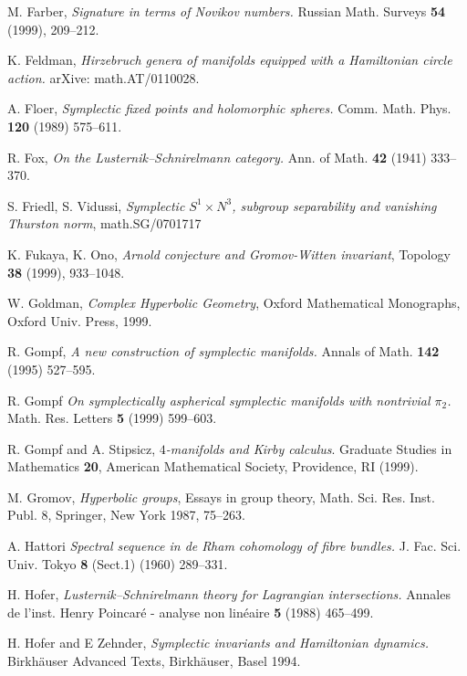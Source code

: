 \documentclass[12pt]{amsart}
\numberwithin{equation}{section}
\theoremstyle{definition}
\theoremstyle{remark}
\numberwithin{figure}{section}
\numberwithin{table}{section}
\begin{document}
\begin{thebibliography}{ABCDE}
 
 M. Farber, {\em Signature in terms of Novikov numbers.}  
Russian Math. Surveys  
{\bf 54} (1999), 209--212. 
 
 K. Feldman, {\em Hirzebruch genera of manifolds equipped with  
a Hamiltonian  
circle action.} arXive: math.AT/0110028. 
 
A. Floer, {\em Symplectic fixed points and holomorphic spheres.} 
Comm. Math. Phys. {\bf  120} (1989) 575--611. 
 
 
R. Fox, {\em On the Lusternik--Schnirelmann category.} 
Ann. of Math. \textbf{42} (1941) 333--370. 
  
 S. Friedl, S. Vidussi, {\em Symplectic $S^1\times N^3$, 
subgroup separability and vanishing Thurston norm}, math.SG/0701717  
 
 K. Fukaya, K. Ono, 
{\em Arnold conjecture and Gromov-Witten invariant},
Topology {\bf 38} (1999),  933--1048.

W. Goldman, {\it Complex Hyperbolic Geometry},  
Oxford Mathematical Monographs, Oxford Univ. Press, 1999. 
 
R. Gompf, {\em A new construction of symplectic manifolds.} 
Annals of Math. 
{\bf  142} (1995) 527--595. 
 
R. Gompf {\em On symplectically aspherical symplectic manifolds with nontrivial 
$\pi_2$.} Math. Res. Letters {\bf  5} (1999) 599--603. 
 
R. Gompf and A. Stipsicz, {\it {$4$}-manifolds and Kirby calculus}. 
Graduate Studies in  Mathematics {\bf 20}, American Mathematical 
Society, Providence, RI (1999). 
 
M. Gromov, {\it Hyperbolic groups}, 
Essays in group theory, Math. Sci. Res. Inst. Publ. 8, 
Springer, New York 1987, 75--263. 
 
A. Hattori {\em Spectral sequence in de Rham cohomology of fibre bundles.} 
J. Fac. Sci. Univ. Tokyo {\bf  8}  (Sect.1) (1960)  289--331. 
 
H. Hofer, {\em Lusternik--Schnirelmann theory for Lagrangian intersections.}  
Annales de l'inst. Henry Poincar\'e - analyse non lin\'eaire {\bf 5} (1988)  
465--499. 
 
H. Hofer and E Zehnder, {\em Symplectic invariants and Hamiltonian dynamics.} 
Birkh\"auser Advanced Texts, Birkh\"auser, Basel 1994. 
 

\end{thebibliography}
\end{document}
